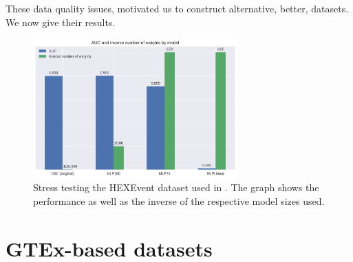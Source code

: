 These data quality issues, motivated us to construct alternative, better, datasets. We now give their results.









\begin{figure}
	\centering\includegraphics[width=0.7\textwidth]{../visualizations/ch5-results/dsc_funeral_barchart.png} 
	\caption{Stress testing the HEXEvent dataset used in \cite{dsc}. The graph shows the performance as well as the inverse of the respective model sizes used.}
	\label{fig:dsc_funeral}
\end{figure}



\section{GTEx-based datasets} \label{sec:gtex}
